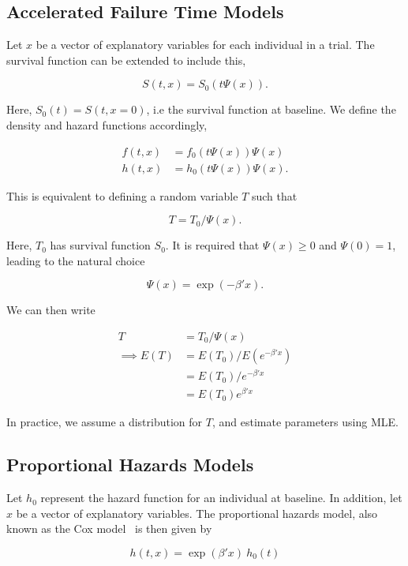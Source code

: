\subsection{Accelerated Failure Time Models}

Let $x$ be a vector of explanatory variables for each individual in a trial. The survival function can be extended to include this,

\[
    S(t, x) = S_0(t\Psi(x)).
\]

Here, $S_0(t) = S(t, x = 0)$, i.e the survival function at baseline. We define the density and hazard functions accordingly,

\begin{align*}
    f(t, x) &= f_0(t\Psi(x))\Psi(x) \\
    h(t, x) &= h_0(t\Psi(x))\Psi(x).
\end{align*}

This is equivalent to defining a random variable $T$ such that

\[
    T = T_0/\Psi(x).  
\]

Here, $T_0$ has survival function $S_0$. It is required that $\Psi(x) \geq 0$ and $\Psi(0) = 1$, leading to the natural choice 

\[
    \Psi(x) = \exp(-\beta'x).  
\]

We can then write 

\begin{align*}
    T &= T_0/\Psi(x) \\
    \implies E(T) &= E(T_0)/E(e^{-\beta'x}) \\
    &= E(T_0)/e^{-\beta'x} \\
    &= E(T_0)e^{\beta'x}
\end{align*}

In practice, we assume a distribution for $T$, and estimate parameters using MLE. 

\subsection{Proportional Hazards Models}
Let $h_0$ represent the hazard function for an individual at baseline. In addition, let $x$ be a vector of explanatory variables. The proportional hazards model, also known as the Cox model~\cite{cox1972} is then given by 

\begin{equation}
    h(t, x) = \exp(\beta'x) \ h_0(t)
    \label{coxmodel}
\end{equation}

